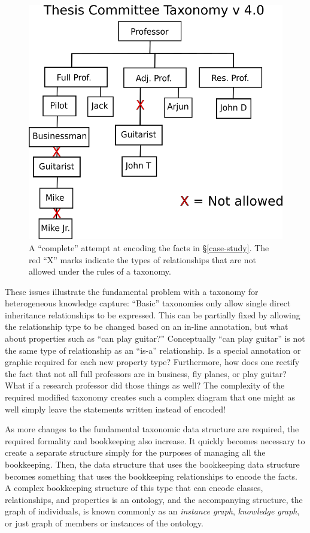 \begin{figure}[htbp]
\centering
\includegraphics[width=\textwidth]{figures/tc-tax-v4-wErrors.png}
\caption{A ``complete'' attempt at encoding the facts in \S \ref{case-study}.
The red ``X'' marks indicate the types of relationships that are not allowed
under the rules of a taxonomy.} 
\label{tax-2}
\end{figure}

These issues illustrate the fundamental problem with a taxonomy for
heterogeneous knowledge capture: ``Basic'' taxonomies only allow single direct
inheritance relationships to be expressed. This can be partially fixed by
allowing the relationship type to be changed based on an in-line annotation, but
what about properties such as ``can play guitar?'' Conceptually ``can play
guitar'' is not the same type of relationship as an ``is-a'' relationship. Is
a special annotation or graphic required for each new property type?
Furthermore, how does one rectify the fact that not all full professors are in
business, fly planes, or play guitar? What if a research professor did those
things as well? The complexity of the required modified taxonomy creates such a
complex diagram that one might as well simply leave the statements written
instead of encoded!

As more changes to the fundamental taxonomic data structure are required, the
required formality and bookkeeping also increase. It quickly becomes necessary
to create a separate structure simply for the purposes of managing all the
bookkeeping. Then, the data structure that uses the bookkeeping data structure
becomes something that uses the bookkeeping relationships to encode the facts.
A complex bookkeeping structure of this type that can encode classes,
relationships, and properties is an ontology, and the accompanying structure,
the graph of individuals, is known commonly as an \textit{instance graph},
\textit{knowledge graph}, or just graph of members or instances of the
ontology.

